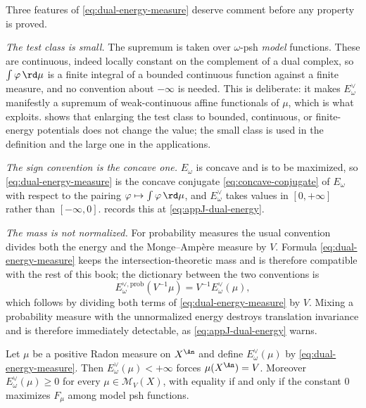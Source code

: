 Three features of \eqref{eq:dual-energy-measure} deserve comment before any
property is proved.

\emph{The test class is small.}  The supremum is taken over
\(\omega\)-psh \emph{model} functions.  These are continuous, indeed
locally constant on the complement of a dual complex, so
\(\int\varphi\,\rd\mu\) is a finite integral of a bounded continuous function
against a finite measure, and no convention about \(-\infty\) is needed.
This is deliberate: it makes \(E^\vee_\omega\) manifestly a supremum of
weak-continuous affine functionals of \(\mu\), which is what
 exploits.
 shows that enlarging the test class to bounded,
continuous, or finite-energy potentials does not change the value; the small
class is used in the definition and the large one in the applications.

\emph{The sign convention is the concave one.}  \(E_\omega\) is concave and
is to be maximized, so \eqref{eq:dual-energy-measure} is the concave
conjugate \eqref{eq:concave-conjugate} of \(E_\omega\) with respect to the
pairing \(\varphi\mapsto\int\varphi\,\rd\mu\), and
\(E^\vee_\omega\) takes values in \([0,+\infty]\) rather than
\([-\infty,0]\).   records this at
\eqref{eq:appJ-dual-energy}.

\emph{The mass is not normalized.}  For probability measures the usual
convention divides both the energy and the Monge--Amp\`ere measure by \(V\).
Formula \eqref{eq:dual-energy-measure} keeps the intersection-theoretic mass
and is therefore compatible with the rest of this book; the dictionary
between the two conventions is
\begin{equation}
\label{eq:ch28-probability-dictionary}
 E_\omega^{\vee,\mathrm{prob}}(V^{-1}\mu)=V^{-1}E_\omega^\vee(\mu),
\end{equation}
which follows by dividing both terms of \eqref{eq:dual-energy-measure} by
\(V\).  Mixing a probability measure with the unnormalized energy destroys
translation invariance and is therefore immediately detectable, as
\eqref{eq:appJ-dual-energy} warns.

\begin{lemma}
\label{lem:ch28-mass-forced}
Let \(\mu\) be a positive Radon measure on \(X^{\An}\) and define
\(E^\vee_\omega(\mu)\) by \eqref{eq:dual-energy-measure}.  Then
\(E^\vee_\omega(\mu)<+\infty\) forces \(\mu(X^{\An})=V\).  Moreover
\(E^\vee_\omega(\mu)\geq0\) for every \(\mu\in\mathcal M_V(X)\), with
equality if and only if the constant \(0\) maximizes \(F_\mu\) among model
psh functions.
\end{lemma}

